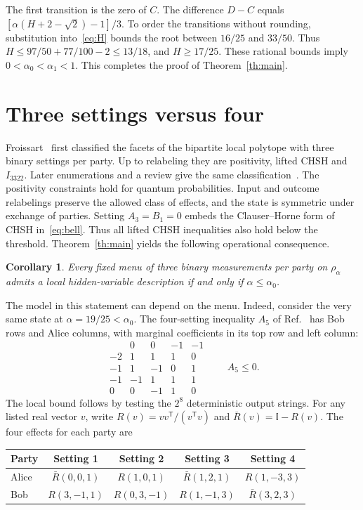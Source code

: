 \documentclass[11pt]{article}
\newtheorem{corollary}[theorem]{Corollary}
\newcommand{\id}{\mathbb I}
\newcommand{\ra}{\alpha_{0}}
\newcommand{\rb}{\alpha_{1}}
\begin{document}
The first transition is the zero of $C$. The difference $D-C$ equals $[\alpha(H+2-\sqrt2)-1]/3$. To order the transitions without rounding, substitution into~\eqref{eq:H} bounds the root between $16/25$ and $33/50$. Thus $H\le 97/50+77/100-2\le13/18$, and $H\ge17/25$. These rational bounds imply $0<\ra<\rb<1$. This completes the proof of Theorem~\ref{th:main}.

\section{Three settings versus four}
Froissart~\cite{froissart} first classified the facets of the bipartite local polytope with three binary settings per party. Up to relabeling they are positivity, lifted CHSH and $I_{3322}$. Later enumerations and a review give the same classification~\cite{ps,cg,scarani}. The positivity constraints hold for quantum probabilities. Input and outcome relabelings preserve the allowed class of effects, and the state is symmetric under exchange of parties. Setting $A_3=B_1=0$ embeds the Clauser--Horne form of CHSH in~\eqref{eq:bell}. Thus all lifted CHSH inequalities also hold below the threshold. Theorem~\ref{th:main} yields the following operational consequence.
\begin{corollary}
Every fixed menu of three binary measurements per party on $\rho_\alpha$ admits a local hidden-variable description if and only if $\alpha\le\ra$.
\end{corollary}
The model in this statement can depend on the menu. Indeed, consider the very same state at $\alpha=19/25<\ra$. The four-setting inequality $A_5$ of Ref.~\cite{ito} has Bob rows and Alice columns, with marginal coefficients in its top row and left column:
\[
 \begin{array}{c|rrrr}
     &0&0&-1&-1\\\hline
 -2&1&1&1&0\\
 -1&1&-1&0&1\\
 -1&-1&1&1&1\\
  0&0&-1&1&0
 \end{array}\qquad A_5\le0.
\]
The local bound follows by testing the $2^8$ deterministic output strings. For any listed real vector $v$, write $R(v)=vv^{\mathsf T}/(v^{\mathsf T}v)$ and $\bar R(v)=\id-R(v)$. The four effects for each party are
\begin{center}
\begin{tabular}{@{}lcccc@{}}
\toprule
Party & Setting 1 & Setting 2 & Setting 3 & Setting 4\\
\midrule
Alice & $\bar R(0,0,1)$ & $R(1,0,1)$ & $\bar R(1,2,1)$ & $R(1,-3,3)$\\
Bob & $R(3,-1,1)$ & $R(0,3,-1)$ & $R(1,-1,3)$ & $\bar R(3,2,3)$\\
\bottomrule
\end{tabular}
\end{center}
\end{document}
